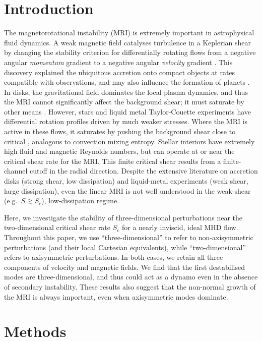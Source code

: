 \documentclass[openacc]{rsproca_new}%
\begin{document}
\section{Introduction}
The magnetorotational instability (MRI) is extremely important in astrophysical fluid dynamics.
A weak magnetic field catalyses turbulence in a Keplerian shear by changing the stability criterion for differentially rotating flows from a negative angular \emph{momentum} gradient to a negative angular \emph{velocity} gradient \cite{1998RvMP...70....1B,2010RSPTA.368.1607J}.
This discovery explained the ubiquitous accretion onto compact objects at rates compatible with observations, and may also influence the formation of planets \cite{2007Natur.448.1022J}.
In disks, the gravitational field dominates the local plasma dynamics, and thus the MRI cannot significantly affect the background shear; it must saturate by other means \cite{2018MNRAS.474.3451X}.
However, stars and liquid metal Taylor-Couette experiments have differential rotation profiles driven by much weaker stresses.
Where the MRI is active in these flows, it saturates by pushing the background shear close to critical \cite{2015RSPSA.47140699V,2017ApJ...841....1C,2017ApJ...841....2C}, analogous to convection mixing entropy.
Stellar interiors have extremely high fluid and magnetic Reynolds numbers, but can operate at or near the critical shear rate for the MRI.
This finite critical shear results from a finite-channel cutoff in the radial direction.
Despite the extensive literature on accretion disks (strong shear, low dissipation) and liquid-metal experiments (weak shear, large dissipation), even the linear MRI is not well understood in the weak-shear (e.g.\ $S \gtrsim S_c$), low-dissipation regime. 

Here, we investigate the stability of three-dimensional perturbations near the two-dimensional critical shear rate $S_{c}$ for a nearly inviscid, ideal MHD flow.
Throughout this paper, we use ``three-dimensional'' to refer to non-axisymmetric perturbations (and their local Cartesian equivalents), while ``two-dimensional'' refers to axisymmetric perturbations.
In both cases, we retain all three components of velocity and magnetic fields.
We find that the first destabilised modes are three-dimensional, and thus could act as a dynamo even in the absence of secondary instability.
These results also suggest that the non-normal growth of the MRI is always important, even when axisymmetric modes dominate.

\section{Methods}
\label{sec:methods}
\end{document}
